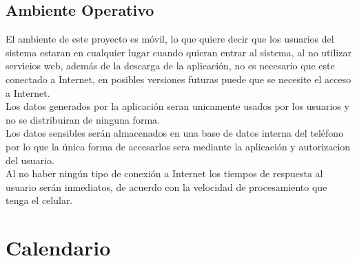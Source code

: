 \documentclass[12pt]{article}
\begin{document}
\subsection{Ambiente Operativo}

El ambiente de este proyecto es m\'ovil, lo que quiere decir que los usuarios del sistema estaran en cualquier lugar cuando quieran entrar al sistema, al no utilizar servicios web, adem\'as de la descarga de la aplicaci\'on, no es necesario que este conectado a Internet, en posibles versiones futuras puede que se necesite el acceso a Internet.\\ 
Los datos generados por la aplicaci\'on seran unicamente usados por los usuarios y no se distribuiran de ninguna forma.\\
Los datos sensibles ser\'an almacenados en una base de datos interna del tel\'efono por lo que la \'unica forma de accesarlos sera mediante la aplicaci\'on y autorizacion del usuario.\\
Al no haber ning\'un tipo de conexi\'on a Internet los tiempos de respuesta al usuario ser\'an inmediatos, de acuerdo con la velocidad de procesamiento que tenga el celular.

\newpage
\section{Calendario}
\end{document}
